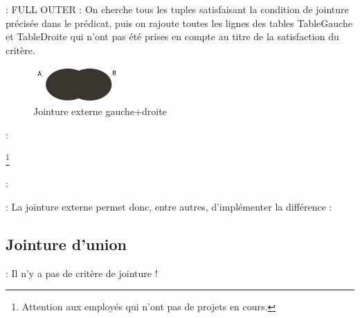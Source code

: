 \documentclass[10pt]{beamer}
\begin{document}
\begin{frame}{\secname : \subsecname}
    FULL OUTER : On cherche tous les tuples satisfaisant la condition de jointure précisée dans le prédicat, puis on rajoute toutes les lignes des tables TableGauche et TableDroite qui n'ont pas été prises en compte au titre de la satisfaction du critère.
    \begin{figure}
        \begin{center}
            \includegraphics[width=0.3\textwidth]{../assets/img/full-join.pdf}
            \caption{Jointure externe gauche+droite}
        \end{center}
    \end{figure}
\end{frame}

\begin{frame}{\secname : \subsecname}
    
    \footnote{Attention aux employés qui n'ont pas de projets en cours.}
\end{frame}

\begin{frame}{\secname : \subsecname}
    
\end{frame}

\begin{frame}{\secname : \subsecname}
    La jointure externe permet donc, entre autres, d'implémenter la différence :
    
\end{frame}

\subsection{Jointure d'union}
\begin{frame}{\secname : \subsecname}
    Il n'y a pas de critère de jointure !
    
\end{frame}
\end{document}
